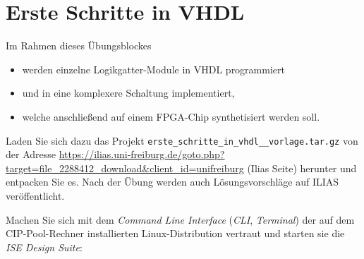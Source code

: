 \documentclass[12pt]{article}
\begin{document}




\part*{Erste Schritte in VHDL}


Im Rahmen dieses Übungsblockes
\vspace*{-5pt}
\begin{itemize}
    \setlength\itemsep{-5pt}
    \item werden einzelne Logikgatter-Module in VHDL programmiert
    \item und in eine komplexere Schaltung implementiert,
    \item welche anschließend auf einem FPGA-Chip synthetisiert werden soll.
\end{itemize}


Laden Sie sich dazu das Projekt \texttt{erste\_schritte\_in\_vhdl\_\_vorlage.tar.gz}
von der Adresse \url{https://ilias.uni-freiburg.de/goto.php?target=file_2288412_download&client_id=unifreiburg} (Ilias Seite)  herunter und entpacken Sie es.
Nach der Übung werden auch Lösungsvorschläge auf ILIAS veröffentlicht.







Machen Sie sich mit dem \textit{Command Line Interface} (\textit{CLI}, \textit{Terminal}) der auf dem CIP-Pool-Rechner installierten Linux-Distribution vertraut
und starten sie die \textit{ISE Design Suite}:
\end{document}
